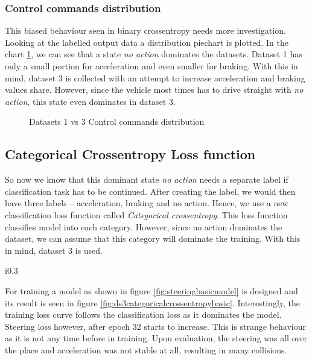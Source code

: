 \subsubsection*{Control commands distribution}
This biased behaviour seen in binary crossentropy needs more investigation. Looking
at the labelled output data a distribution piechart is plotted. In the chart
\ref{fig:datasetscomparectrlcmds}, we can see that a state \textit{no action} dominates
the datasets. Dataset 1 has only a small portion for acceleration and even smaller for
braking. With this in mind, dataset 3 is collected with an attempt to increase acceleration
and braking values share. However, since the vehicle most times has to drive straight with
\textit{no action}, this state even dominates in dataset 3.
\begin{figure}[h]
    \centering
    \def\svgwidth{\textwidth}
    
    \caption{Datasets 1 vs 3 Control commands distribution}
    \label{fig:datasetscomparectrlcmds}
\end{figure}

\subsection{Categorical Crossentropy Loss function}
So now we know that this dominant state \textit{no action} needs a separate label if
classification task has to be continued. After creating the label, we would then have
three labels -- acceleration, braking and no action. Hence, we use a new classification
loss function called \textit{Categorical crossentropy}. This loss function classifies
model into each category. However, since no action dominates the dataset, we can assume
that this category will dominate the training. With this in mind, dataset 3 is used.
\begin{wrapfigure}{i}{0.3\textwidth}
	\centering
    \def\svgwidth{0.3\textwidth}
    \caption{Basic model}
    \label{fig:steeringbasicmodel}
\end{wrapfigure}
For training a model as shown in figure \ref{fig:steeringbasicmodel} is designed and its
result is seen in figure \ref{fig:ds3categoricalcrossentropybasic}. Interestingly, the
training loss curve follows the classification loss as it dominates the model. Steering
loss however, after epoch 32 starts to increase. This is strange behaviour as it is not
any time before in training. Upon evaluation, the steering was all over the place and
acceleration was not stable at all, resulting in many collisions.

